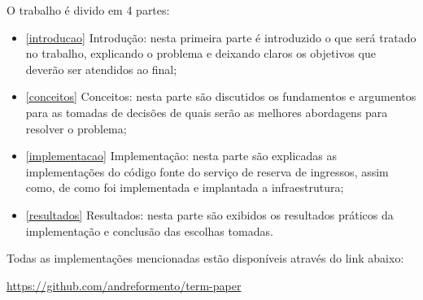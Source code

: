 O trabalho é divido em 4 partes:

\begin{itemize}
    \item \autoref{introducao} Introdução: nesta primeira parte é introduzido o que
          será tratado no trabalho, explicando o problema e deixando claros os
          objetivos que deverão ser atendidos ao final;

    \item \autoref{conceitos} Conceitos: nesta parte são discutidos os fundamentos e
          argumentos para as tomadas de decisões de quais serão as melhores
          abordagens para resolver o problema;

    \item \autoref{implementacao} Implementação: nesta parte são explicadas as
          implementações do código fonte do serviço de reserva de ingressos, assim
          como, de como foi implementada e implantada a infraestrutura;

    \item \autoref{resultados} Resultados: nesta parte são exibidos os resultados
          práticos da implementação e conclusão das escolhas tomadas.

\end{itemize}

Todas as implementações mencionadas estão disponíveis através do link abaixo:

\url{https://github.com/andreformento/term-paper}
